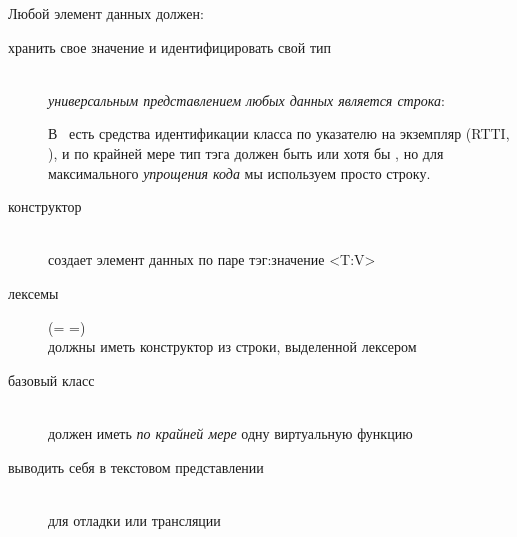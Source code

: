 \clearpage
Любой элемент данных должен:
\begin{description}
\item[хранить свое значение и идентифицировать свой тип]\ \\\emph{универсальным
представлением любых данных является строка}:

В \cpp\ есть средства идентификации класса по указателю на экземпляр (RTTI,
), и по крайней мере тип тэга должен быть  или
хотя бы , но для максимального \emph{упрощения кода} мы
используем просто строку.

\item[конструктор]\ \\создает элемент данных по паре тэг:значение <T:V>
\item[лексемы] (= =)\ \\должны иметь конструктор из
строки, выделенной лексером
\clearpage
\item[базовый класс]\ \\должен иметь \emph{по крайней мере} одну виртуальную
функцию
\item[выводить себя в текстовом представлении]\ \\для отладки или трансляции
\end{description}
